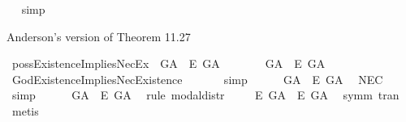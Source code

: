 \begin{isabellebody}
\ %
%
\isamarkupfalse%
\ simp%
%
%
%
\begin{isamarkuptext}%
Anderson's version of Theorem 11.27%
\end{isamarkuptext}\isamarkuptrue%
\isamarkupfalse%
\ possExistenceImpliesNecEx{\isacharcolon}\ {\isachardoublequoteopen}{\isasymlfloor}\isactrlbold {\isasymdiamond}\isactrlbold {\isasymexists}\ G\isactrlsup A\ \isactrlbold {\isasymrightarrow}\ \isactrlbold {\isasymbox}\isactrlbold {\isasymexists}\isactrlsup E\ G\isactrlsup A{\isasymrfloor}{\isachardoublequoteclose}\ %
\isanewline
%
%
%
\isamarkupfalse%
\ {\isacharminus}\isanewline
\ \ \isamarkupfalse%
\ {\isachardoublequoteopen}{\isasymlfloor}\isactrlbold {\isasymexists}\ G\isactrlsup A\ \isactrlbold {\isasymrightarrow}\ \isactrlbold {\isasymbox}\isactrlbold {\isasymexists}\isactrlsup E\ G\isactrlsup A{\isasymrfloor}{\isachardoublequoteclose}\ \isamarkupfalse%
\ GodExistenceImpliesNecExistence\ \isanewline
\ \ \ \ \isamarkupfalse%
\ simp\ %
\isanewline
\ \ \isamarkupfalse%
\ {\isachardoublequoteopen}{\isasymlfloor}\isactrlbold {\isasymbox}{\isacharparenleft}\isactrlbold {\isasymexists}\ G\isactrlsup A\ \isactrlbold {\isasymrightarrow}\ \isactrlbold {\isasymbox}\isactrlbold {\isasymexists}\isactrlsup E\ G\isactrlsup A{\isacharparenright}{\isasymrfloor}{\isachardoublequoteclose}\ \isamarkupfalse%
\ NEC\ \isamarkupfalse%
\ simp\isanewline
\ \ \isamarkupfalse%
\ {}{\isacharcolon}\ {\isachardoublequoteopen}{\isasymlfloor}\isactrlbold {\isasymdiamond}\isactrlbold {\isasymexists}\ G\isactrlsup A\ \isactrlbold {\isasymrightarrow}\ \isactrlbold {\isasymdiamond}\isactrlbold {\isasymbox}\isactrlbold {\isasymexists}\isactrlsup E\ G\isactrlsup A{\isasymrfloor}{\isachardoublequoteclose}\ \isamarkupfalse%
\ {\isacharparenleft}rule\ modal{\isacharunderscore}distr{\isacharparenright}\isanewline
\ \ \isamarkupfalse%
\ {}{\isacharcolon}\ {\isachardoublequoteopen}{\isasymlfloor}\isactrlbold {\isasymdiamond}\isactrlbold {\isasymbox}\isactrlbold {\isasymexists}\isactrlsup E\ G\isactrlsup A\ \isactrlbold {\isasymrightarrow}\ \isactrlbold {\isasymbox}\isactrlbold {\isasymexists}\isactrlsup E\ G\isactrlsup A{\isasymrfloor}{\isachardoublequoteclose}\ \isamarkupfalse%
\ symm\ tran\ \isamarkupfalse%
\ metis\isanewline

\end{isabellebody}
